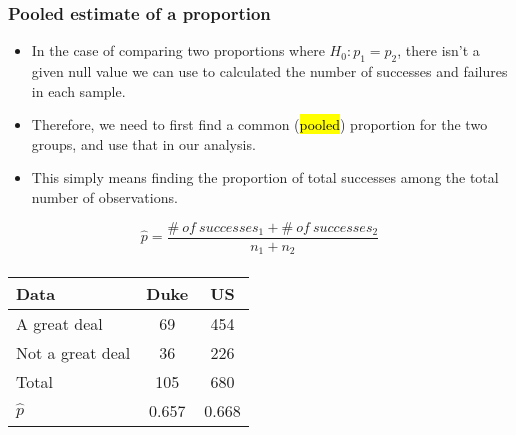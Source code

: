 \begin{frame}
\frametitle{Pooled estimate of a proportion}

\begin{itemize}

\item In the case of comparing two proportions where $H_0: p_1 = p_2$, there isn't a given null value we can use to calculated the  number of successes and failures in each sample.

\pause

\item Therefore, we need to first find a common (\hl{pooled}) proportion for the two groups, and use that in our analysis.

\pause

\item This simply means finding the proportion of total successes among the total number of observations.

\end{itemize}

$\:$ \\

{ \[ \hat{p} = \frac{\#~of~successes_1 + \#~of~successes_2}{n_1 + n_2} \] }

\end{frame}


\begin{frame}
\frametitle{}


{\footnotesize
\begin{center}
\begin{tabular}{l | c c}
Data			& Duke		& US \\
\hline
A great deal	& 69			& 454 \\
Not a great deal& 36			& 226 \\
\hline
Total			& 105		& 680 \\
\hline
$\hat{p}$		& 0.657		& 0.668
\end{tabular}
\end{center}
}

\pause


\end{frame}

